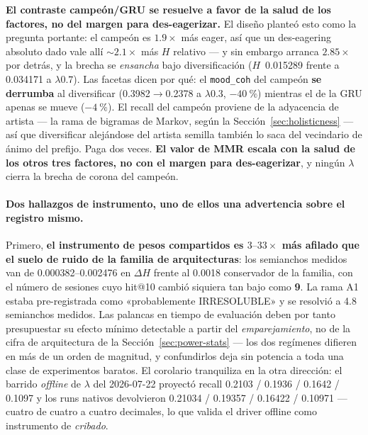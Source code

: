 \documentclass[11pt]{article}
\begin{document}
\textbf{El contraste campeón/GRU se resuelve a favor de la salud de los factores,
no del margen para des-eagerizar.} El diseño planteó esto como la pregunta
portante: el campeón es $\num{1.9}\times$ más eager, así que un des-eagering
absoluto dado vale allí ${\sim}\num{2.1}\times$ más $H$ relativo --- y sin embargo
arranca $\num{2.85}\times$ por detrás, y la brecha se \emph{ensancha} bajo
diversificación ($H$~\num{0.015289} frente a \num{0.034171} a
$\lambda\num{0.7}$). Las facetas dicen por qué: el \texttt{mood\_coh} del campeón
\textbf{se derrumba} al diversificar (\num{0.3982}$\to$\num{0.2378} a
$\lambda\num{0.3}$, $-\SI{40}{\percent}$) mientras el de la GRU apenas se mueve
($-\SI{4}{\percent}$). El recall del campeón proviene de la adyacencia de artista
--- la rama de bigramas de Markov, según la
Sección~\ref{sec:holisticness} --- así que diversificar alejándose del artista
semilla también lo saca del vecindario de ánimo del prefijo. Paga dos veces.
\textbf{El valor de MMR escala con la salud de los otros tres factores, no con el
margen para des-eagerizar}, y ningún $\lambda$ cierra la brecha de corona del
campeón.

\paragraph{Dos hallazgos de instrumento, uno de ellos una advertencia sobre el
registro mismo.} Primero, \textbf{el instrumento de pesos compartidos es
$\numrange{3}{33}\times$ más afilado que el suelo de ruido de la familia de
arquitecturas}: los semianchos medidos van de \numrange{0.000382}{0.002476} en
$\Delta H$ frente al \num{0.0018} conservador de la familia, con el número de
sesiones cuyo hit@10 cambió siquiera tan bajo como \textbf{\num{9}}. La rama A1
estaba pre-registrada como «probablemente IRRESOLUBLE» y se resolvió a \num{4.8}
semianchos medidos. Las palancas en tiempo de evaluación deben por tanto
presupuestar su efecto mínimo detectable a partir del \emph{emparejamiento}, no de
la cifra de arquitectura de la Sección~\ref{sec:power-stats} --- los dos
regímenes difieren en más de un orden de magnitud, y confundirlos deja sin
potencia a toda una clase de experimentos baratos. El corolario tranquiliza en la
otra dirección: el barrido \emph{offline} de $\lambda$ del 2026-07-22 proyectó
recall \num{0.2103} / \num{0.1936} / \num{0.1642} / \num{0.1097} y los runs
nativos devolvieron \num{0.21034} / \num{0.19357} / \num{0.16422} / \num{0.10971}
--- cuatro de cuatro a cuatro decimales, lo que valida el driver offline como
instrumento de \emph{cribado}.
\end{document}
